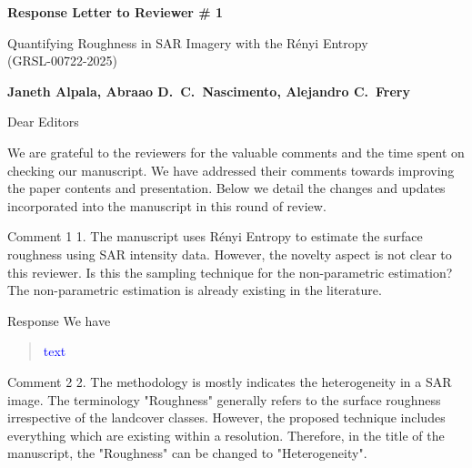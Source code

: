 \documentclass[11pt]{report}
\begin{document}
\begin{center}
\large{\textbf{Response Letter to Reviewer \# 1}}

\vglue 0.3cm

\huge{ Quantifying Roughness in SAR Imagery with the Rényi Entropy\\ (GRSL-00722-2025)}
\end{center}

\begin{center}
\textbf{Janeth Alpala,   Abraao D.\ C.\ Nascimento, Alejandro C.\ Frery  }
\end{center}

\date{\today}



\vspace{2cm}
\noindent Dear Editors
\bigskip

\noindent We are grateful to the reviewers for the valuable comments and the time spent on checking our manuscript. 
We have addressed their comments towards improving the paper contents and presentation. 
Below we detail the changes and updates incorporated into the manuscript in this round of review.

\medskip


\begin{reviewbox}{Comment 1}
1. The manuscript uses Rényi Entropy to estimate the surface roughness using SAR intensity data. However, the novelty aspect is not clear to this reviewer. Is this the sampling technique for the non-parametric estimation? The non-parametric estimation is already existing in the literature.

\end{reviewbox}

\begin{responsebox}{Response}
We have 
\begin{quote}
	\textcolor{blue}{ text}
\end{quote}
\end{responsebox}

\vspace{2em}
\begin{reviewbox}{Comment 2}
2. The methodology is mostly indicates the heterogeneity in a SAR image. The terminology "Roughness" generally refers to the surface roughness irrespective of the landcover classes. However, the proposed technique includes everything which are existing within a resolution. Therefore, in the title of the manuscript, the "Roughness" can be changed to "Heterogeneity".
\end{reviewbox}
\end{document}

